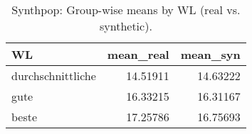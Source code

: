 \begin{table}

\caption{\label{tab:tab:synthpop:wlmeans}Synthpop: Group-wise means by WL (real vs. synthetic).}
\centering
\begin{tabular}[t]{lrr}
\toprule
WL & mean\_real & mean\_syn\\
\midrule
durchschnittliche & 14.51911 & 14.63222\\
gute & 16.33215 & 16.31167\\
beste & 17.25786 & 16.75693\\
\bottomrule
\end{tabular}
\end{table}
